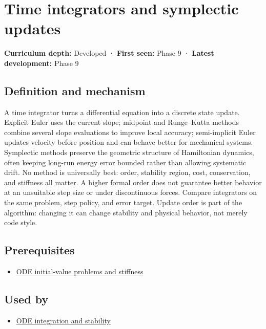 \hypertarget{appendix-8f96f9c4d5bc}{}\label{referencestart:appendix-8f96f9c4d5bc}
\section{Time integrators and symplectic updates}\label{appendix-8f96f9c4d5bc-time-integrators-and-symplectic-updates}

\textbf{Curriculum depth:} Developed · \textbf{First seen:} Phase 9 · \textbf{Latest development:} Phase 9

\subsection{Definition and mechanism}\label{appendix-8f96f9c4d5bc-definition-and-mechanism}

A time integrator turns a differential equation into a discrete state update. Explicit Euler uses the current slope; midpoint and Runge--Kutta methods combine several slope evaluations to improve local accuracy; semi-implicit Euler updates velocity before position and can behave better for mechanical systems. Symplectic methods preserve the geometric structure of Hamiltonian dynamics, often keeping long-run energy error bounded rather than allowing systematic drift. No method is universally best: order, stability region, cost, conservation, and stiffness all matter. A higher formal order does not guarantee better behavior at an unsuitable step size or under discontinuous forces. Compare integrators on the same problem, step policy, and error target. Update order is part of the algorithm: changing it can change stability and physical behavior, not merely code style.

\subsection{Prerequisites}\label{appendix-8f96f9c4d5bc-prerequisites}

\begin{itemize}
\tightlist
\item
  \hyperref[appendix-e8ab9836882e]{ODE initial-value problems and stiffness}
\end{itemize}

\subsection{Used by}\label{appendix-8f96f9c4d5bc-used-by}

\begin{itemize}
\tightlist
\item
  \hyperref[appendix-18eacf61a04b]{ODE integration and stability}
\end{itemize}

